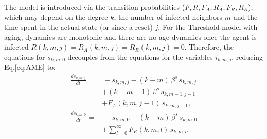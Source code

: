     The model is introduced via the transition probabilities ($F, R, F_A, R_A, F_R, R_R$), which may depend on the degree $k$, the number of infected neighbors $m$ and the time spent in the actual state (or since a reset) $j$. For the Threshold model with aging, dynamics are monotonic and there are no age dynamics once the agent is infected $R (k,m,j) = R_A (k,m,j) = R_R(k,m,j) = 0$. Therefore, the equations for $s_{k,m,0}$  decouples from the equations for the variables $i_{k,m,j}$, reducing Eq.\eqref{eq:AME} to:
    \begin{align}
    \label{eq:AME_Threshold_AP}
        \frac{d s_{k,m,j}}{dt}  = & \, - s_{k,m,j} - (k - m)\, \beta^s \,   s_{k,m,j} \nonumber\\
        & + (k-m+1) \, \beta^s \,  s_{k,m-1,j-1}  \nonumber\\
        & + F_{A} (k,m,j-1)\,  s_{k,m,j-1},  \\
        \frac{d s_{k,m,0}}{dt}  = & \,  - s_{k,m,0} - (k - m)\, \beta^s \,  s_{k,m,0} \nonumber \\
        & + \sum_{l = 0}^{\infty} F_{R}(k,m,l) \, s_{k,m,l} . \nonumber
    \end{align}